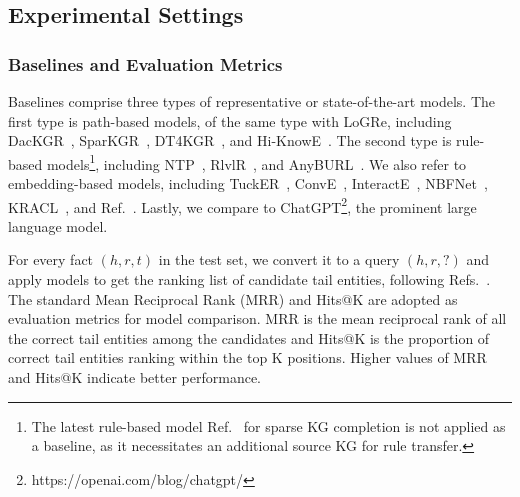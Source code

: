 \documentclass[sigconf]{acmart}
\begin{document}
\subsection{Experimental Settings}
\subsubsection{Baselines and Evaluation Metrics}
Baselines comprise three types of representative or state-of-the-art models. The first type is path-based models, of the same type with LoGRe, including DacKGR~\cite{DacKGR}, SparKGR~\cite{SparKGR}, DT4KGR~\cite{DT4KGR}, and Hi-KnowE~\cite{Hi-KnowE}. The second type is rule-based models\footnote{The latest rule-based model Ref.~\cite{Rule-SKGC-2023} for sparse KG completion is not applied as a baseline, as it necessitates an additional source KG for rule transfer.}, including NTP~\cite{NTP}, RlvlR~\cite{RlvlR}, and AnyBURL~\cite{AnyBURL}.  We also refer to embedding-based models, including TuckER~\cite{TuckER}, ConvE~\cite{ConvE}, InteractE~\cite{InteractE}, NBFNet~\cite{NBFNet}, KRACL~\cite{SKGC2023-KRACL}, and Ref.~\cite{SKG2023-Application}. Lastly, we compare to ChatGPT\footnote{https://openai.com/blog/chatgpt/}, the prominent large language model.

For every fact $(h, r, t)$ in the test set, we convert it to a query $(h, r, ?)$ and apply models to get the ranking list of candidate tail entities, following Refs.~\cite{DacKGR,SparKGR}. The standard Mean Reciprocal Rank (MRR) and Hits@K are adopted as evaluation metrics for model comparison. MRR is the mean reciprocal rank of all the correct tail entities among the candidates and Hits@K is the proportion of correct tail entities ranking within the top K positions. Higher values of MRR and Hits@K indicate better performance.
\end{document}
